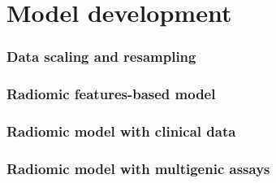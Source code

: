 \section{Model development}


\begin{frame}
    \frametitle{Data scaling and resampling}
    \vspace{3mm}



    \vfill 
\end{frame}


\begin{frame}
    \frametitle{Radiomic features-based model}
    \vspace{3mm}



    \vfill 
\end{frame}


\begin{frame}
    \frametitle{Radiomic model with clinical data}
    \vspace{3mm}



    \vfill 
\end{frame}



\begin{frame}
    \frametitle{Radiomic model with multigenic assays}
    \vspace{3mm}



    \vfill 
\end{frame}